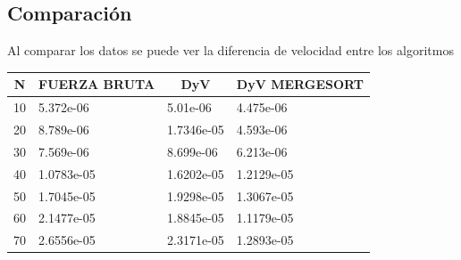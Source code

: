 \subsection{Comparación}
Al comparar los datos se puede ver la diferencia de velocidad entre los algoritmos\\

\label{tabla_comp}
\begin{center}
\begin{longtable}{l|l|l|l}
\multicolumn{1}{c}{\textbf{N}} & \multicolumn{1}{c}{\textbf{FUERZA BRUTA}} & \multicolumn{1}{c}{\textbf{DyV}} & \multicolumn{1}{c}{\textbf{DyV MERGESORT}} \\
\hline
10                                                     & 5.372e-06                                                         & 5.01e-06                                                 & 4.475e-06                                                          \\
20                                                     & 8.789e-06                                                         & 1.7346e-05                                               & 4.593e-06                                                          \\
30                                                     & 7.569e-06                                                         & 8.699e-06                                                & 6.213e-06                                                          \\
40                                                     & 1.0783e-05                                                        & 1.6202e-05                                               & 1.2129e-05                                                         \\
50                                                     & 1.7045e-05                                                        & 1.9298e-05                                               & 1.3067e-05                                                         \\
60                                                     & 2.1477e-05                                                        & 1.8845e-05                                               & 1.1179e-05                                                         \\
70                                                     & 2.6556e-05                                                        & 2.3171e-05                                               & 1.2893e-05                                                         \\

\end{longtable}
\end{center}

